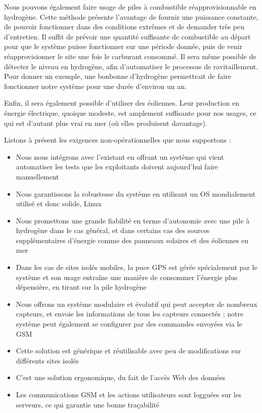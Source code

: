 Nous pouvons également faire usage de piles à combustible réapprovisionnable en hydrogène. Cette méthode présente l’avantage de fournir une puissance constante, de pouvoir fonctionner dans des conditions extrêmes et de demander très peu d’entretien. Il suffit de prévoir une quantité suffisante de combustible au départ pour que le système puisse fonctionner sur une période donnée, puis de venir réapprovisionner le site une fois le carburant consommé. Il sera même possible de détecter le niveau en hydrogène, afin d’automatiser le processus de ravitaillement. Pour donner un exemple, une bonbonne d’hydrogène permettrait de faire fonctionner notre système pour une durée d’environ un an. 

Enfin, il sera également possible d’utiliser des éoliennes. Leur production en énergie électrique, quoique modeste, est amplement suffisante pour nos usages, ce qui est d’autant plus vrai en mer (où elles produisent davantage).

Listons à présent les exigences non-opérationnelles que nous supportons :

\begin{itemize}
\item Nous nous intégrons avec l’existant en offrant un système qui vient automatiser les tests que les exploitants doivent aujourd’hui faire manuellement
\item Nous garantissons la robustesse du système en utilisant un OS mondialement utilisé et donc solide, Linux
\item Nous promettons une grande fiabilité en terme d’autonomie avec une pile à hydrogène dans le cas général, et dans certains cas des sources supplémentaires d’énergie comme des panneaux solaires et des éoliennes en mer
\item Dans les cas de sites isolés mobiles, la puce GPS est gérée spécialement par le système et son usage entraîne une manière de consommer l’énergie plus dépensière, en tirant sur la pile hydrogène 
\item Nous offrons un système modulaire et évolutif qui peut accepter de nombreux capteurs, et envoie les informations de tous les capteurs connectés ; notre système peut également se configurer par des commandes envoyées via le GSM
\item Cette solution est générique et réutilisable avec peu de modifications sur différents sites isolés
\item C’est une solution ergonomique, du fait de l’accès Web des données
\item Les communications GSM et les actions utilisateurs sont logguées sur les serveurs, ce qui garantie une bonne traçabilité
\end{itemize}


